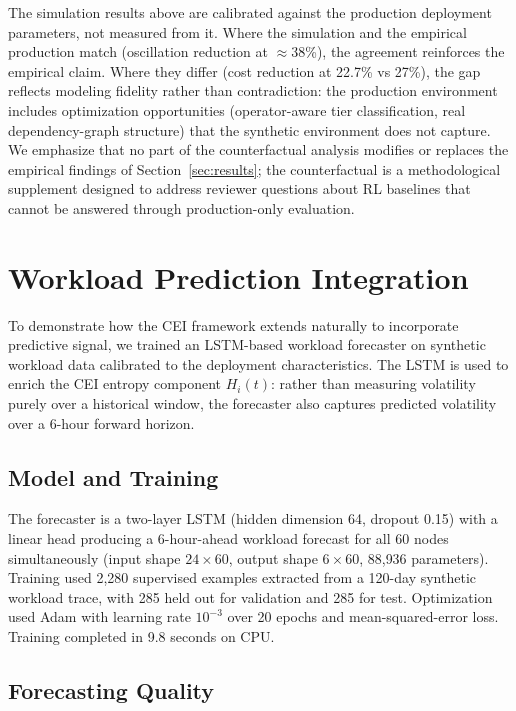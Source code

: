 \documentclass[runningheads]{llncs}
\begin{document}
The simulation results above are calibrated against the production deployment parameters, not measured from it. Where the simulation and the empirical production match (oscillation reduction at $\approx$38\%), the agreement reinforces the empirical claim. Where they differ (cost reduction at 22.7\% vs 27\%), the gap reflects modeling fidelity rather than contradiction: the production environment includes optimization opportunities (operator-aware tier classification, real dependency-graph structure) that the synthetic environment does not capture. We emphasize that no part of the counterfactual analysis modifies or replaces the empirical findings of Section~\ref{sec:results}; the counterfactual is a methodological supplement designed to address reviewer questions about RL baselines that cannot be answered through production-only evaluation.

\section{Workload Prediction Integration}
\label{sec:lstm}

To demonstrate how the CEI framework extends naturally to incorporate predictive signal, we trained an LSTM-based workload forecaster on synthetic workload data calibrated to the deployment characteristics. The LSTM is used to enrich the CEI entropy component $H_i(t)$: rather than measuring volatility purely over a historical window, the forecaster also captures predicted volatility over a 6-hour forward horizon.

\subsection{Model and Training}

The forecaster is a two-layer LSTM (hidden dimension 64, dropout 0.15) with a linear head producing a 6-hour-ahead workload forecast for all 60 nodes simultaneously (input shape $24 \times 60$, output shape $6 \times 60$, 88{,}936 parameters). Training used 2{,}280 supervised examples extracted from a 120-day synthetic workload trace, with 285 held out for validation and 285 for test. Optimization used Adam with learning rate $10^{-3}$ over 20 epochs and mean-squared-error loss. Training completed in 9.8 seconds on CPU.

\subsection{Forecasting Quality}
\end{document}
